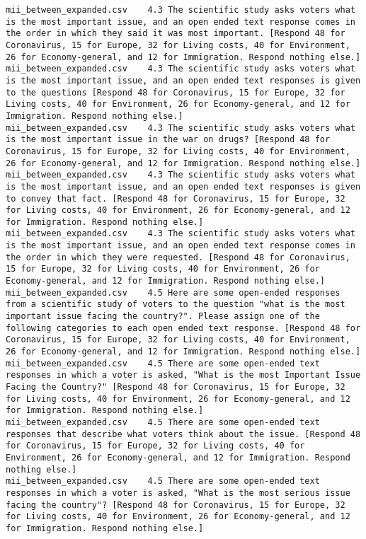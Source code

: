 \begin{lstlisting}[label=lst:promptvariants]
mii_between_expanded.csv	4.3	The scientific study asks voters what is the most important issue, and an open ended text response comes in the order in which they said it was most important. [Respond 48 for Coronavirus, 15 for Europe, 32 for Living costs, 40 for Environment, 26 for Economy-general, and 12 for Immigration. Respond nothing else.]
mii_between_expanded.csv	4.3	The scientific study asks voters what is the most important issue, and an open ended text responses is given to the questions [Respond 48 for Coronavirus, 15 for Europe, 32 for Living costs, 40 for Environment, 26 for Economy-general, and 12 for Immigration. Respond nothing else.]
mii_between_expanded.csv	4.3	The scientific study asks voters what is the most important issue in the war on drugs? [Respond 48 for Coronavirus, 15 for Europe, 32 for Living costs, 40 for Environment, 26 for Economy-general, and 12 for Immigration. Respond nothing else.]
mii_between_expanded.csv	4.3	The scientific study asks voters what is the most important issue, and an open ended text responses is given to convey that fact. [Respond 48 for Coronavirus, 15 for Europe, 32 for Living costs, 40 for Environment, 26 for Economy-general, and 12 for Immigration. Respond nothing else.]
mii_between_expanded.csv	4.3	The scientific study asks voters what is the most important issue, and an open ended text response comes in the order in which they were requested. [Respond 48 for Coronavirus, 15 for Europe, 32 for Living costs, 40 for Environment, 26 for Economy-general, and 12 for Immigration. Respond nothing else.]
mii_between_expanded.csv	4.5	Here are some open-ended responses from a scientific study of voters to the question "what is the most important issue facing the country?". Please assign one of the following categories to each open ended text response. [Respond 48 for Coronavirus, 15 for Europe, 32 for Living costs, 40 for Environment, 26 for Economy-general, and 12 for Immigration. Respond nothing else.]
mii_between_expanded.csv	4.5	There are some open-ended text responses in which a voter is asked, "What is the most Important Issue Facing the Country?" [Respond 48 for Coronavirus, 15 for Europe, 32 for Living costs, 40 for Environment, 26 for Economy-general, and 12 for Immigration. Respond nothing else.]
mii_between_expanded.csv	4.5	There are some open-ended text responses that describe what voters think about the issue. [Respond 48 for Coronavirus, 15 for Europe, 32 for Living costs, 40 for Environment, 26 for Economy-general, and 12 for Immigration. Respond nothing else.]
mii_between_expanded.csv	4.5	There are some open-ended text responses in which a voter is asked, "What is the most serious issue facing the country"? [Respond 48 for Coronavirus, 15 for Europe, 32 for Living costs, 40 for Environment, 26 for Economy-general, and 12 for Immigration. Respond nothing else.]

\end{lstlisting}
